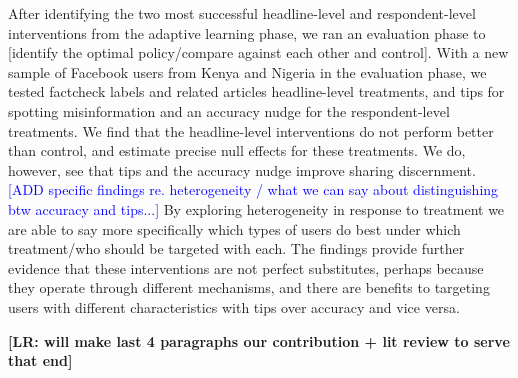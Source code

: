 \documentclass[letterpaper, 12pt, parskip=full,DIV=10]{scrartcl}
\begin{document}



After identifying the two most successful headline-level and respondent-level interventions from the adaptive learning phase,  we ran an evaluation phase to [identify the optimal policy/compare against each other and control].  With a new sample of Facebook users from Kenya and Nigeria in the evaluation phase, we tested  factcheck labels and related articles headline-level treatments, and tips for spotting misinformation \citep{guessetal2020digital} and an accuracy nudge \citep{pennycook2021shifting} for the respondent-level treatments. We find that the headline-level interventions do not perform better than control, and estimate precise null effects for these treatments. We do, however, see that tips and the accuracy nudge improve sharing discernment.  \textcolor{blue}{[ADD specific findings re. heterogeneity / what we can say about distinguishing btw accuracy and tips...]} By exploring heterogeneity in response to treatment we are able to say more specifically which types of users do best under which treatment/who should be targeted with each. The findings provide further evidence that these interventions are not perfect substitutes, perhaps because they operate through different mechanisms, and there are benefits to targeting users with different characteristics with tips over accuracy and vice versa. %





\textbf{[LR: will make last 4 paragraphs our contribution + lit review to serve that end]}
\end{document}
